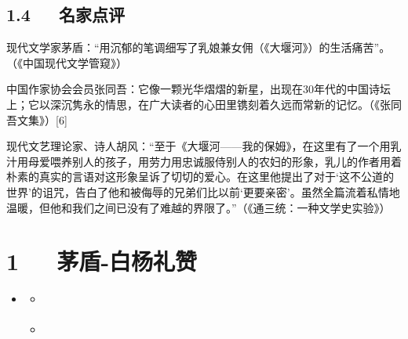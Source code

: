 \documentclass[letterpaper,12pt,english]{sphinxmanual}
\begin{document}
\section{1.4   名家点评}
\label{\detokenize{p01_u6563_u6587/_u827e_u9752-_u5927_u5830_u6cb3_u2014_u2014_u6211_u7684_u4fdd_u59c6:id6}}
现代文学家茅盾：“用沉郁的笔调细写了乳娘兼女佣（《大堰河》）的生活痛苦”。（《中国现代文学管窥》）

中国作家协会会员张同吾：它像一颗光华熠熠的新星，出现在30年代的中国诗坛上；它以深沉隽永的情思，在广大读者的心田里镌刻着久远而常新的记忆。（《张同吾文集》）{[}6{]}

现代文艺理论家、诗人胡风：“至于《大堰河——我的保姆》，在这里有了一个用乳汁用母爱喂养别人的孩子，用劳力用忠诚服侍别人的农妇的形象，乳儿的作者用着朴素的真实的言语对这形象呈诉了切切的爱心。在这里他提出了对于‘这不公道的世界’的诅咒，告白了他和被侮辱的兄弟们比以前‘更要亲密’。虽然全篇流着私情地温暖，但他和我们之间已没有了难越的界限了。”（《通三统：一种文学史实验》）


\chapter{1   茅盾-白杨礼赞}
\label{\detokenize{p01_u6563_u6587/_u8305_u76fe-_u767d_u6768_u793c_u8d5e:id1}}\label{\detokenize{p01_u6563_u6587/_u8305_u76fe-_u767d_u6768_u793c_u8d5e::doc}}
\begin{sphinxShadowBox}
\begin{itemize}
\item {} 
\label{\detokenize{p01_u6563_u6587/_u8305_u76fe-_u767d_u6768_u793c_u8d5e:id5}}{\hyperref[\detokenize{p01_u6563_u6587/_u8305_u76fe-_u767d_u6768_u793c_u8d5e:id1}]{}}
\begin{itemize}
\item {} 
\label{\detokenize{p01_u6563_u6587/_u8305_u76fe-_u767d_u6768_u793c_u8d5e:id6}}{\hyperref[\detokenize{p01_u6563_u6587/_u8305_u76fe-_u767d_u6768_u793c_u8d5e:id3}]{}}

\item {} 
\label{\detokenize{p01_u6563_u6587/_u8305_u76fe-_u767d_u6768_u793c_u8d5e:id7}}{\hyperref[\detokenize{p01_u6563_u6587/_u8305_u76fe-_u767d_u6768_u793c_u8d5e:id4}]{}}

\end{itemize}

\end{itemize}
\end{sphinxShadowBox}
\end{document}
